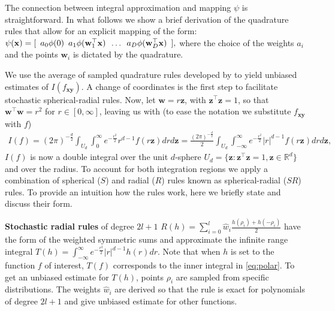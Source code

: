 The connection between integral approximation and mapping $\psi$ is straightforward. In what follows we show a brief derivation of the quadrature rules that allow for an explicit mapping of the form:
${
    \psi(\mathbf{x}) = [\enskip a_0 \phi(0) \enskip
    a_1 \phi(\mathbf{w}_1^{\top} \mathbf{x})
    \enskip \dots \enskip
    a_D \phi(\mathbf{w}_{D}^\top \mathbf{x}) \enskip],}
$
where the choice of the weights $a_i$ and the points $\mathbf{w}_i$ is dictated by the quadrature.

We use the average of sampled quadrature rules developed by \citep{genz1998stochastic} to yield unbiased estimates of $I(f_{\mathbf{xy}})$. A change of coordinates is the first step to facilitate stochastic spherical-radial rules. Now, let $\mathbf{w} = r\mathbf{z}$, with $\mathbf{z}^{\boldsymbol{\top}}\mathbf{z} = 1$, so that $\mathbf{w}^{\boldsymbol{\top}}\mathbf{w}=r^2$ for $r \in [0, \infty]$, leaving us with (to ease the notation we substitute $f_{\mathbf{xy}}$ with $f$)
\begin{equation}
\begin{split}
\label{eq:polar}
I(f) = (2\pi)^{-\frac{d}{2}} \int_{U_d} \int_{0}^{\infty} e^{-\frac{r^2}{2}} r^{d-1} f(r\mathbf{z})dr d\mathbf{z} =
\frac{(2\pi)^{-\frac{d}{2}}}{2} \int_{U_d} \int_{-\infty}^{\infty} e^{-\frac{r^2}{2}} |r|^{d-1} f(r\mathbf{z})dr d\mathbf{z},
\end{split}
\end{equation}
$I(f)$ is now a double integral over the unit $d$-sphere $U_d = \{\mathbf{z}: \mathbf{z}^{\boldsymbol{\top}}\mathbf{z} = 1, \mathbf{z} \in \mathbb{R}^d\}$ and over the radius. To account for both integration regions we apply a combination of spherical ($S$) and radial ($R$) rules known as spherical-radial ($SR$) rules.
To provide an intuition how the rules work, here we briefly state and discuss their form.

\textbf{Stochastic radial rules} of degree ${2l+1}$
$R(h) = \sum\limits_{i=0}^{l} \hat{w}_i \frac{h(\rho_i) + h(-\rho_i)}{2}$
have the form of the weighted symmetric sums and approximate the infinite range integral
$T(h) = \int_{-\infty}^{\infty} e^{-\frac{r^2}{2}} |r|^{d-1} h(r) dr$.
Note that when $h$ is set to the function $f$ of interest, $T(f)$ corresponds to the inner integral in \eqref{eq:polar}.
To get an unbiased estimate for $T(h)$, points $\rho_i$ are sampled from specific distributions.
The weights $\hat{w}_i$ are derived so that the rule is exact for
polynomials of degree $2l + 1$ and give unbiased estimate for other functions.

